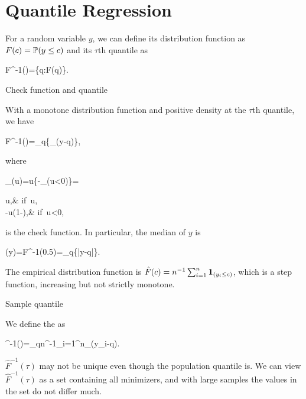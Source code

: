 \documentclass[10pt,a4paper]{book}
\begin{document}
\section{Quantile Regression}\label{sec:qt_reg}
For a random variable $y$, we can define its distribution function as $F(c)=\mathbb P(y\leq c)$ and its $\tau$th quantile as 
\begin{sequation*}
	F^{-1}(\tau)=\inf\{q:F(q)\geq \tau\}.
\end{sequation*}  
\begin{thmbox}{Check function and quantile}
	\begin{proposition}\label{prop:check_function_qt}
		With a monotone distribution function and positive density at the $\tau$th quantile, we have  
		\begin{sequation}\label{eq:qt}
			F^{-1}(\tau)=\arg\min_{q\in\bbR}\bbE\left\{\rho_{\tau}(y-q)\right\},
		\end{sequation}
		where 
		\begin{sequation*}
			\rho_\tau(u)=u\left\{\tau-\1_{(u<0)}\right\}=\begin{cases}
				u\tau,& if\ u,\\
				-u(1-\tau),& if\ u<0,
			\end{cases}
		\end{sequation*}
		is the check function. In particular, the median of $y$ is  
		\begin{sequation*}
			(y)=F^{-1}(0.5)=_{q\in{}}\bbE\left\{|y-q|\right\}.
		\end{sequation*}
	\end{proposition}
\end{thmbox}

The empirical distribution function is $\hat{F}(c)=n^{-1}\sum_{i=1}^{n}{\boldsymbol 1}_{(y_i\leq c)}$, which is a step function,
increasing but not strictly monotone.
\begin{defbox}{Sample quantile}
	\begin{definition}\label{def:sample_qt}
		We define the  as 
		\begin{sequation}\label{eq:sample_qt}
			^{-1}(\tau)=\arg\min_{q\in{}}n^{-1}\sum_{i=1}^n\rho_\tau(y_i-q).
		\end{sequation}
	\end{definition}
\end{defbox}
$\hat{F}^{-1}(\tau)$ may not be unique even though the population quantile is. We can view $\hat{F}^{-1}(\tau)$ as a set containing all minimizers, and with large samples the values in the set do not differ much.
\end{document}
